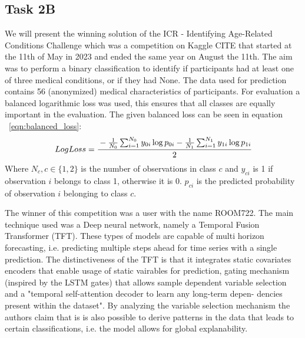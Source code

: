 \subsection{Task 2B}
We will present the winning solution of the ICR - Identifying Age-Related Conditions Challenge which was a competition on
Kaggle CITE that started at the 11th of May in 2023 and ended the same year on August the 11th. The aim
was to perform a binary classification to identify if participants had at least one of three medical conditions, or if they had
None. The data used for prediction contains 56 (anonymized) medical characteristics of participants. For evaluation a balanced logarithmic loss
was used, this ensures that all classes are equally important in the evaluation. The given balanced loss can be seen in equation
~\ref{eqn:balanced_loss}:
\begin{equation}
    Log Loss = \cfrac{-\frac{1}{N_0}\sum^{N_0}_{i=1}y_{0i}\log p_{0i}-\frac{1}{N_1}\sum^{N_1}_{i=1}y_{1i}\log p_{1i}}{2}
    \label{eqn:balanced_loss}
\end{equation}
Where $N_{c}, c\in\{1, 2\}$ is the number of observations in class $c$ and $y_{c i}$ is 1 if observation $i$ belongs to class
1, otherwise it is 0. $p_{ci}$ is the predicted probability of observation $i$ belonging to class $c$.

The winner of this competition was a user with the name ROOM722. The main technique used was a Deep neural network, namely a
Temporal Fusion Transformer (TFT). These types of models are capable of multi horizon forecasting, i.e. predicting multiple
steps ahead for time series with a single prediction. The distinctiveness of the TFT is that it integrates static covariates
encoders that enable usage of static vairables for prediction, gating mechanism (inspired by the LSTM gates) that allows
sample dependent variable selection and a "temporal self-attention decoder to learn any long-term depen-
dencies present within the dataset". By analyzing the variable selection mechanism the authors claim that is is also possible
to derive patterns in the data that leads to certain classifications, i.e. the model allows for global explanability.

